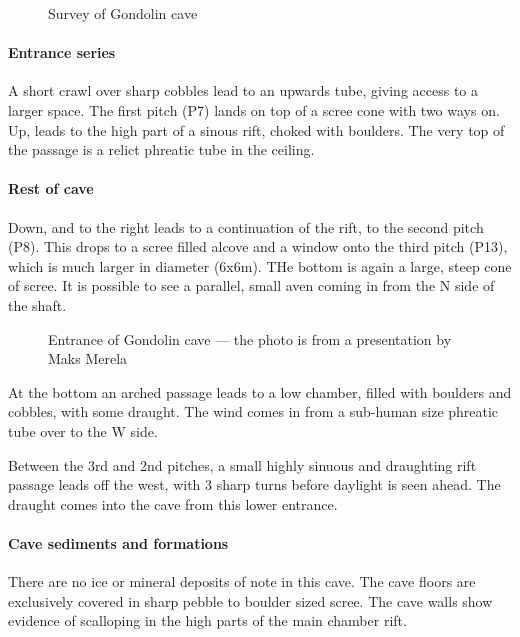 \documentclass[symmetric, a4paper, 11pt]{article}
\begin{document}
\begin{wrapfigure}{r}{0.5\textwidth}
    
    \caption{Survey of Gondolin cave}
    \label{}
\end{wrapfigure}

\paragraph{Entrance series}
A short crawl over sharp cobbles lead to an upwards tube, giving access to a larger space. The first pitch (P7) lands on top of a scree cone with two ways on. Up, leads to the high part of a sinous rift, choked with boulders. The very top of the passage is a relict phreatic tube in the ceiling. 

\paragraph{Rest of cave}
Down, and to the right leads to a continuation of the rift, to the second pitch (P8). This drops to a scree filled alcove and a window onto the third pitch (P13), which is much larger in diameter (6x6m). THe bottom is again a large, steep cone of scree. It is possible to see a parallel, small aven coming in from the N side of the shaft. 
\begin{wrapfigure}{l}{0.5\textwidth}
    
    \caption{Entrance of Gondolin cave --- the photo is from a presentation by Maks Merela \cite{maks}}
    \label{}
\end{wrapfigure}
At the bottom an arched passage leads to a low chamber, filled with boulders and cobbles, with some draught. The wind comes in from a sub-human size phreatic tube over to the W side. 

Between the 3rd and 2nd pitches, a small highly sinuous and draughting rift passage leads off the west, with 3 sharp turns before daylight is seen ahead. The draught comes into the cave from this lower entrance.



\paragraph{Cave sediments and formations} 
There are no ice or mineral deposits of note in this cave. The cave floors are exclusively covered in sharp pebble to boulder sized scree. The cave walls show evidence of scalloping in the high parts of the main chamber rift.
\end{document}
